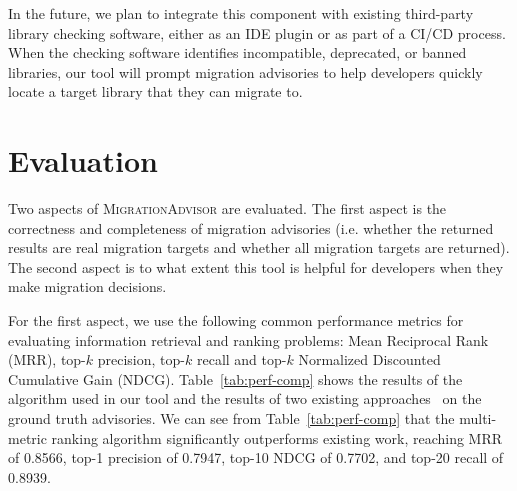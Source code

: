 \documentclass[conference,10pt]{IEEEtran}
\begin{document}
In the future, we plan to integrate this component with existing third-party library checking software, either as an IDE plugin or as part of a CI/CD process.
When the checking software identifies incompatible, deprecated, or banned libraries, our tool will prompt migration advisories to help developers quickly locate a target library that they can migrate to.

\section{Evaluation}

Two aspects of \textsc{MigrationAdvisor} are evaluated. %
The first aspect is the correctness and completeness of migration advisories (i.e. whether the returned results are real migration targets and whether all migration targets are returned). 
The second aspect is to what extent this tool is helpful for developers when they make migration decisions.

For the first aspect, we use the following common performance metrics for evaluating information retrieval and ranking problems: Mean Reciprocal Rank (MRR),
top-$k$ precision, top-$k$ recall and top-$k$ Normalized Discounted Cumulative Gain (NDCG).
Table~\ref{tab:perf-comp} shows the results of the algorithm used in our tool and the results of two existing approaches~\cite{teyton2012mining, alrubaye2019migrationminer} on the ground truth advisories.
We can see from Table~\ref{tab:perf-comp} that the multi-metric ranking algorithm significantly outperforms existing work, reaching MRR of 0.8566, top-1 precision of 0.7947, top-10 NDCG of 0.7702, and top-20 recall of 0.8939.
\end{document}
